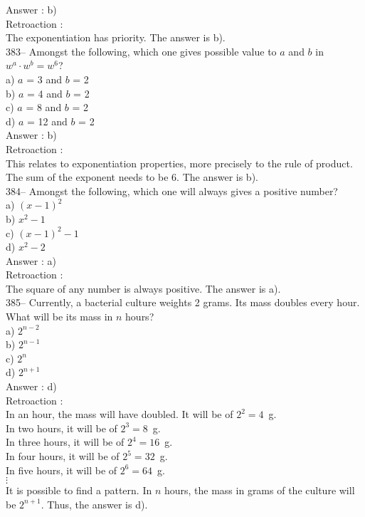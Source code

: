 ﻿\documentclass[letterpaper, 12pt]{article}
\begin{document}
Answer : b)\\

Retroaction : \\
The exponentiation has priority. The answer is b).\\

383-- Amongst the following, which one gives possible value to $a$ and $b$ in $w^{a}\cdot w^{b}=w^{6}$?\\
a) $a$ = 3 and $b$ = 2\\
b) $a$ = 4 and $b$ = 2\\
c) $a$ = 8 and $b$ = 2\\
d) $a$ = 12 and $b$ = 2\\

Answer : b) \\

Retroaction : \\
This relates to exponentiation properties, more precisely to the rule of product. The sum of the exponent needs to be 6. The answer is b).\\


384-- Amongst the following, which one will always gives a positive number?\\
a) $\left( x-1\right) ^2$\\
b) $x^{2}-1$\\
c) $\left( x-1\right) ^2-1$\\
d)  $x^{2}-2$\\

Answer : a)\\

Retroaction : \\
The square of any number is always positive. The answer is a).\\

385-- Currently, a bacterial culture weights 2 grams.
Its mass doubles every hour. What will be its mass in $n$ hours?\\
a) $2^{n-2}$\\
b) $2^{n-1}$\\
c) $2^{n}$\\
d) $2^{n+1}$\\

Answer : d)\\


Retroaction : \\
In an hour, the mass will have doubled. It will be of $2^{2}=4$~g.\\
In two hours, it will be of $2^{3}=8$~g.\\
In three hours, it will be of $2^{4}=16$~g.\\
In four hours, it will be of $2^{5}=32$~g.\\
In five hours, it will be of $2^{6}=64$~g.\\
$\vdots$\\
It is possible to find a pattern. In $n$ hours, the mass in grams of the culture will be $2^{n+1}$.  Thus, the answer is d).\\
\end{document}
